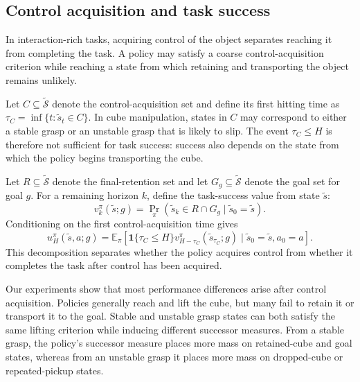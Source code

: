 \subsection{Control acquisition and task success}
\label{sec:tail_successor_gaps}

In interaction-rich tasks, 
acquiring control of the object separates reaching it from completing the task.
A policy may satisfy a coarse control-acquisition criterion while reaching a state from which retaining and transporting the object remains unlikely.

Let $C\subseteq\widetilde{\mathcal S}$ denote the control-acquisition set and define its first hitting time as $\tau_C=\inf\{t:\tilde{s}_t\in C\}$.
In cube manipulation, states in $C$ may correspond to either a stable grasp or an unstable grasp that is likely to slip.
The event $\tau_C\leq H$ is therefore not sufficient for task success: success also depends on the state from which the policy begins transporting the cube.

Let $R\subseteq\widetilde{\mathcal S}$ denote the final-retention set and let $G_g\subseteq\widetilde{\mathcal S}$ denote the goal set for goal $g$. 
For a remaining horizon $k$, define the task-success value from state $\tilde{s}$:
\begin{equation}
    v_k^\pi(\tilde{s};g) = \Pr_\pi \left( \tilde{s}_k\in R\cap G_g \mid \tilde{s}_0=\tilde{s} \right).
    \label{eq:tail_success}
\end{equation}
Conditioning on the first control-acquisition time gives
\begin{equation}
    u_H^\pi(\tilde{s},a;g) = \mathbb{E}_\pi \left[ \mathbf{1}\{\tau_C\leq H\} v_{H-\tau_C}^\pi(\tilde{s}_{\tau_C};g) \mid \tilde{s}_0=\tilde{s},a_0=a \right].
    \label{eq:bridge_decomposition}
\end{equation}
This decomposition separates whether the policy acquires control from whether it completes the task after control has been acquired.

Our experiments show that most performance differences arise after control acquisition.
Policies generally reach and lift the cube, but many fail to retain it or transport it to the goal.
Stable and unstable grasp states can both satisfy the same lifting criterion while inducing different successor measures.
From a stable grasp, the policy's successor measure places more mass on retained-cube and goal states, whereas from an unstable grasp it places more mass on dropped-cube or repeated-pickup states.

